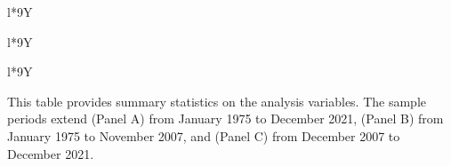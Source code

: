 \documentclass[11pt,halfline,a4paper]{ouparticle}
\begin{document}
\begin{table}[htb!]
  \caption{Summary statistics}
  \label{tbl:stats}
  \begin{tabularx}{\linewidth}{l*{9}{Y}}
    \toprule
     \\
    \midrule
  
  \end{tabularx}

\begin{tabularx}{\linewidth}{l*{9}{Y}}
    \toprule
     \\
    \midrule
         
  \end{tabularx}
  
  \begin{tabularx}{\linewidth}{l*{9}{Y}}
    \toprule
     \\
    \midrule
         
        \cr
    \bottomrule 
  \end{tabularx}
  This table provides summary statistics on the analysis variables. The sample periods extend (Panel A) from January 1975 to December 2021, (Panel B) from January 1975 to November 2007, and (Panel C) from December 2007 to December 2021. 
\end{table}

\newpage
\end{document}
